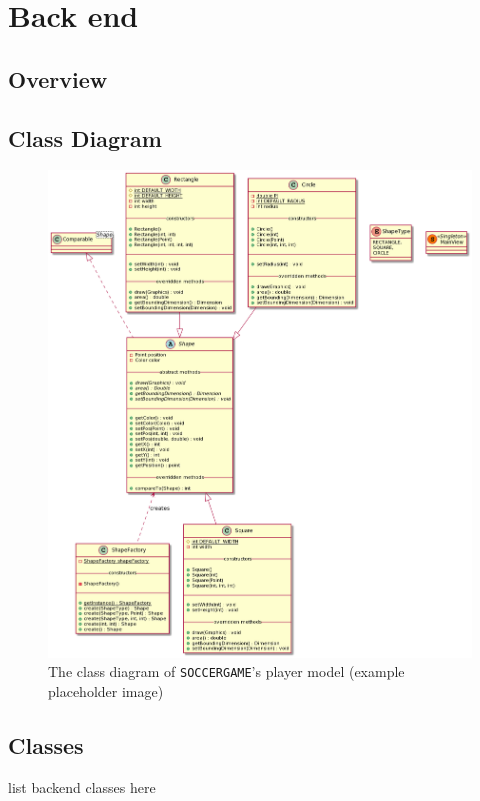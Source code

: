 \documentclass[12pt, dvipsnames, a4paper]{article}
\newcommand{\code}[1]{\texttt{#1}}
\begin{document}
\clearpage

\section{Back end}
\subsection{Overview}

\subsection{Class Diagram}
\begin{center}
	\begin{figure}[H]
		\hspace{30pt}
		\includegraphics[scale=.5]{diagrams/class-diagrams/shape-model/shape-model-alt-cd.png}
		\caption{The class diagram of \code{SOCCERGAME}'s player model (example placeholder image)}
		\label{fig:backend}
	\end{figure}
\end{center}
\clearpage
\subsection{Classes}
list backend classes here
\end{document}
